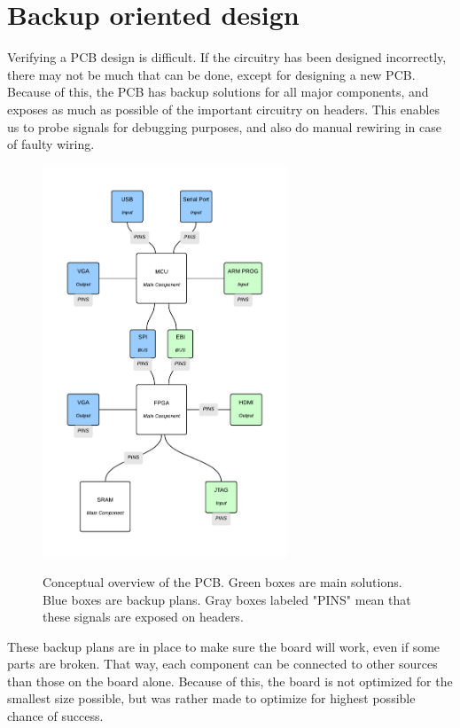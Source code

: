 \documentclass[../main/report.tex]{subfiles}
\begin{document}
\section{Backup oriented design}

Verifying a PCB design is difficult.
If the circuitry has been designed incorrectly, there may not be much that can be done, except for designing a new PCB.
Because of this, the PCB has backup solutions for all major components, and exposes as much as possible of the important circuitry on headers.
This enables us to probe signals for debugging purposes, and also do manual rewiring in case of faulty wiring.

\begin{figure}[H]
    \centering
    \includegraphics[width=0.65\textwidth]{../pcb/assets/pcb-overview.pdf}
    \label{fig:pcb-overview}
    \caption{Conceptual overview of the PCB. Green boxes are main solutions. Blue boxes are backup plans.
             Gray boxes labeled "PINS" mean that these signals are exposed on headers.}
\end{figure}

These backup plans are in place to make sure the board will work, even if some parts are broken.
That way, each component can be connected to other sources than those on the board alone.
Because of this, the board is not optimized for the smallest size possible, but was rather made to optimize for highest possible chance of success.
\end{document}
